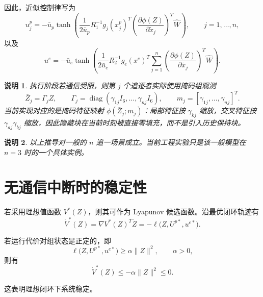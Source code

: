 ﻿\documentclass[12pt,a4paper]{ctexart}
\newtheorem{remark}{说明}
\begin{document}
因此，近似控制律写为
\begin{equation}
    u_j^p
    =
    -\bar u_p
    \tanh\!\left(
    \frac{1}{2\bar u_p}
    R_1^{-1}
    g_j(x_j^p)^T
    \left(\frac{\partial \phi(Z)}{\partial \tilde x_j}\right)^T\hat W
    \right),
    \qquad j=1,\dots,n,
\end{equation}
以及
\begin{equation}
    u^e
    =
    -\bar u_e
    \tanh\!\left(
    \frac{1}{2\bar u_e}
    R_2^{-1}
    g_e(x^e)^T
    \sum_{j=1}^{n}\left(\frac{\partial \phi(Z)}{\partial \tilde x_j}\right)^T\hat W
    \right).
\end{equation}

\begin{remark}
执行阶段若通信受限，则第 $j$ 个追逐者实际使用掩码组观测
\begin{equation}
    \bar Z_j=\Gamma_j Z,
    \qquad
    \Gamma_j=\operatorname{diag}(\gamma_{1j}I_6,\dots,\gamma_{nj}I_6),
    \qquad
    m_j=[\gamma_{1j},\dots,\gamma_{nj}]^T.
\end{equation}
当前实现对应的是掩码特征映射 $\phi(\bar Z_j;m_j)$：局部特征按 $\gamma_{kj}$ 缩放，交叉特征按 $\gamma_{aj}\gamma_{bj}$ 缩放，因此隐藏块在当前时刻被直接零填充，而不是引入历史保持块。
\end{remark}

\begin{remark}
以上推导对一般的 $n$ 追一场景成立。当前工程实验只是该一般模型在 $n=3$ 时的一个具体实例。
\end{remark}

\section{无通信中断时的稳定性}

若采用理想值函数 $V^*(Z)$，则其可作为 Lyapunov 候选函数。沿最优闭环轨迹有
\begin{equation}
    \dot V^*(Z)
    =
    \nabla V^*(Z)^T\dot Z
    =
    -\ell\big(Z,U^{p*},u^{e*}\big).
\end{equation}

若运行代价对组状态是正定的，即
\begin{equation}
    \ell\big(Z,U^{p*},u^{e*}\big)\ge \alpha\|Z\|^2,
    \qquad \alpha>0,
\end{equation}
则有
\begin{equation}
    \dot V^*(Z)\le -\alpha\|Z\|^2\le 0.
\end{equation}

这表明理想闭环下系统稳定。
\end{document}
